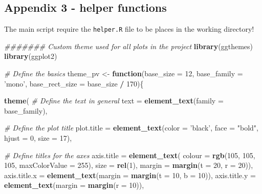 \documentclass[]{article}
\newenvironment{Shaded}{\begin{snugshade}}{\end{snugshade}}
\newcommand{\CommentTok}[1]{\textcolor[rgb]{0.56,0.35,0.01}{\textit{#1}}}
\newcommand{\ControlFlowTok}[1]{\textcolor[rgb]{0.13,0.29,0.53}{\textbf{#1}}}
\newcommand{\DataTypeTok}[1]{\textcolor[rgb]{0.13,0.29,0.53}{#1}}
\newcommand{\DecValTok}[1]{\textcolor[rgb]{0.00,0.00,0.81}{#1}}
\newcommand{\KeywordTok}[1]{\textcolor[rgb]{0.13,0.29,0.53}{\textbf{#1}}}
\newcommand{\NormalTok}[1]{#1}
\newcommand{\OperatorTok}[1]{\textcolor[rgb]{0.81,0.36,0.00}{\textbf{#1}}}
\newcommand{\StringTok}[1]{\textcolor[rgb]{0.31,0.60,0.02}{#1}}
\begin{document}
\hypertarget{appendix-3---helper-functions}{%
\subsection{Appendix 3 - helper
functions}\label{appendix-3---helper-functions}}

The main script require the \texttt{helper.R} file to be places in the
working directory!

\begin{Shaded}
\begin{Highlighting}[]
\CommentTok{####### Custom theme used for all plots in the project}
\KeywordTok{library}\NormalTok{(ggthemes)}
\KeywordTok{library}\NormalTok{(ggplot2)}

\CommentTok{# Define the basics }
\NormalTok{theme_pv <-}\StringTok{ }\ControlFlowTok{function}\NormalTok{(}\DataTypeTok{base_size =} \DecValTok{12}\NormalTok{,}
                      \DataTypeTok{base_family =} \StringTok{'mono'}\NormalTok{,}
                      \DataTypeTok{base_rect_size =}\NormalTok{ base_size }\OperatorTok{/}\StringTok{ }\DecValTok{170}\NormalTok{)\{}
  
  
  \KeywordTok{theme}\NormalTok{(}
    \CommentTok{# Define the text in general}
    \DataTypeTok{text =} \KeywordTok{element_text}\NormalTok{(}\DataTypeTok{family =}\NormalTok{ base_family),}
    
    \CommentTok{# Define the plot title}
    \DataTypeTok{plot.title =} \KeywordTok{element_text}\NormalTok{(}\DataTypeTok{color =} \StringTok{'black'}\NormalTok{, }\DataTypeTok{face =} \StringTok{"bold"}\NormalTok{, }\DataTypeTok{hjust =} \DecValTok{0}\NormalTok{, }\DataTypeTok{size =} \DecValTok{17}\NormalTok{),}
    
    \CommentTok{# Define titles for the axes}
    \DataTypeTok{axis.title =} \KeywordTok{element_text}\NormalTok{(}
      \DataTypeTok{colour =} \KeywordTok{rgb}\NormalTok{(}\DecValTok{105}\NormalTok{, }\DecValTok{105}\NormalTok{, }\DecValTok{105}\NormalTok{, }\DataTypeTok{maxColorValue =} \DecValTok{255}\NormalTok{),}
      \DataTypeTok{size =} \KeywordTok{rel}\NormalTok{(}\DecValTok{1}\NormalTok{), }\DataTypeTok{margin =} \KeywordTok{margin}\NormalTok{(}\DataTypeTok{t =} \DecValTok{20}\NormalTok{, }\DataTypeTok{r =} \DecValTok{20}\NormalTok{)),}
    \DataTypeTok{axis.title.x =} \KeywordTok{element_text}\NormalTok{(}\DataTypeTok{margin =} \KeywordTok{margin}\NormalTok{(}\DataTypeTok{t =} \DecValTok{10}\NormalTok{, }\DataTypeTok{b =} \DecValTok{10}\NormalTok{)),}
    \DataTypeTok{axis.title.y =} \KeywordTok{element_text}\NormalTok{(}\DataTypeTok{margin =} \KeywordTok{margin}\NormalTok{(}\DataTypeTok{r =} \DecValTok{10}\NormalTok{)),}
    

\end{Highlighting}
\end{Shaded}
\end{document}
